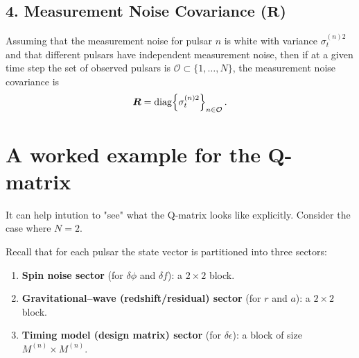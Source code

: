 \documentclass[]{scrartcl}
\begin{document}
	\subsection*{4. Measurement Noise Covariance (\(\boldsymbol{R}\))}
	
	Assuming that the measurement noise for pulsar $n$ is white with variance $\sigma_t^{(n)2}$ and that different pulsars have independent measurement noise, then if at a given time step the set of observed pulsars is $\mathcal{O}\subset\{1,\ldots,N\}$, the measurement noise covariance is
	\begin{equation}
		\boldsymbol{R} = \mathrm{diag}\Bigl\{\sigma_t^{(n)2}\Bigr\}_{n\in\mathcal{O}}\,.
	\end{equation}


	
%
%
%
%
%


\newpage
\appendix
\section{A worked example for the Q-matrix}


It can help intution to "see" what the Q-matrix looks like explicitly. Consider the case where $N=2$. \newline 



	Recall that for each pulsar the state vector is partitioned into three sectors:
	\begin{enumerate}
		\item \textbf{Spin noise sector} (for \(\delta\phi\) and \(\delta f\)): a \(2\times2\) block.
		\item \textbf{Gravitational--wave (redshift/residual) sector} (for \(r\) and \(a\)): a \(2\times2\) block.
		\item \textbf{Timing model (design matrix) sector} (for \(\delta\epsilon\)): a block of size \(M^{(n)}\times M^{(n)}\).
	\end{enumerate}
	
\end{document}
